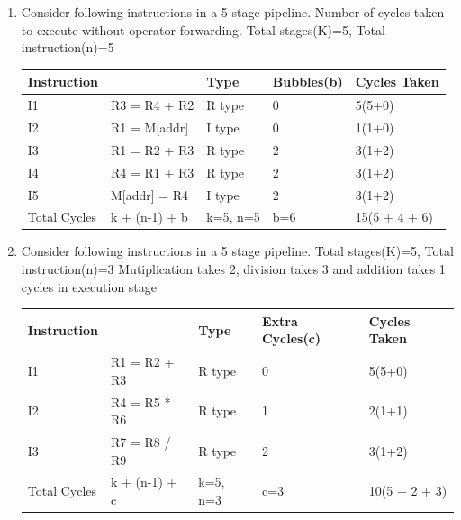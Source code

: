 \begin{enumerate}
    \item Consider following instructions in a 5 stage pipeline. Number of cycles taken to execute without
           operator forwarding. Total stages(K)=5, Total instruction(n)=5   \\
           \begin{myTableStyle} \begin{tabular}{ |m{2cm}|m{3cm}|m{2cm}|m{2cm}|m{3cm}| } \hline
              Instruction &         & Type      & Bubbles(b)& Cycles Taken  \\ \hline
              I1 &  R3 = R4 + R2    & R type    & 0         &   5(5+0) \\ \hline
              I2 &  R1 = M[addr]    & I type    & 0         &   1(1+0) \\ \hline
              I3 &  R1 = R2 + R3    & R type    & 2         &   3(1+2) \\ \hline
              I4 &  R4 = R1 + R3    & R type    & 2         &   3(1+2) \\ \hline
              I5 &  M[addr] = R4    & I type    & 2         &   3(1+2) \\ \hline
              Total Cycles &  k + (n-1) + b     & k=5, n=5  & b=6 &   15(5 + 4 + 6)\\ \hline
           \end{tabular} \end{myTableStyle} \vspace{0.08in}

    \item Consider following instructions in a 5 stage pipeline. Total stages(K)=5, Total instruction(n)=3
          Mutiplication takes 2, division takes 3 and addition takes 1 cycles in execution stage\\
           \begin{myTableStyle} \begin{tabular}{ |m{2cm}|m{3cm}|m{2cm}|m{3cm}|m{3cm}| } \hline
              Instruction &         & Type      & Extra Cycles(c)   & Cycles Taken  \\ \hline
              I1 &  R1 = R2 + R3    & R type    & 0                 &   5(5+0) \\ \hline
              I2 &  R4 = R5 * R6    & R type    & 1                 &   2(1+1) \\ \hline
              I3 &  R7 = R8 / R9    & R type    & 2                 &   3(1+2) \\ \hline
              Total Cycles &  k + (n-1) + c     & k=5, n=3  & c=3   &   10(5 + 2 + 3)\\ \hline
           \end{tabular} \end{myTableStyle} \vspace{0.08in}


\end{enumerate}
